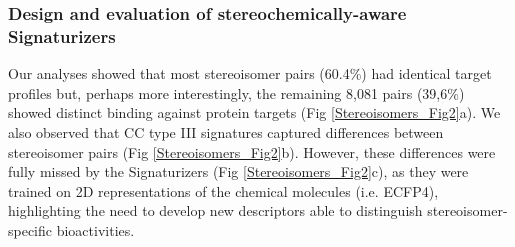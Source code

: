 
\subsubsection{Design and evaluation of stereochemically-aware Signaturizers}
\label{Stereoisomers_Design_Evaluation_Signaturizers}

Our analyses showed that most stereoisomer pairs (60.4\%) had identical target profiles but, perhaps more interestingly, the remaining 8,081 pairs (39,6\%) showed distinct binding against protein targets (Fig \ref{Stereoisomers_Fig2}a). We also observed that CC type III signatures captured differences between stereoisomer pairs (Fig \ref{Stereoisomers_Fig2}b). However, these differences were fully missed by the Signaturizers (Fig \ref{Stereoisomers_Fig2}c), as they were trained on 2D representations of the chemical molecules (i.e. ECFP4\cite{rogers_extended-connectivity_2010}), highlighting the need to develop new descriptors able to distinguish stereoisomer-specific bioactivities.

